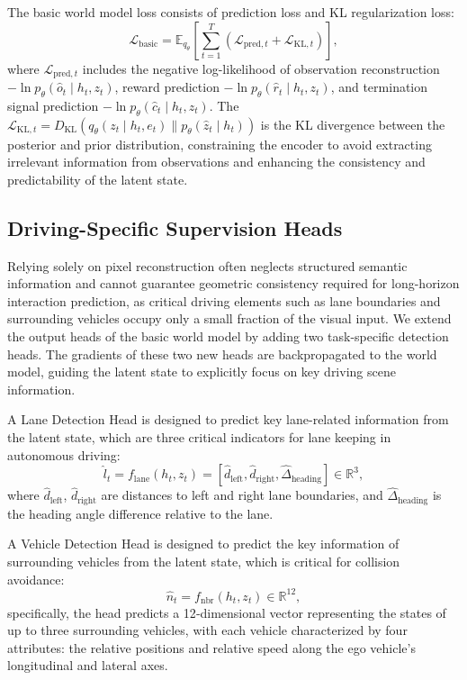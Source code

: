 The basic world model loss consists of prediction loss and KL regularization loss:
\begin{equation}
\mathcal{L}_{\text{basic}} = \mathbb{E}_{q_\theta}\left[\sum_{t=1}^{T} \left(\mathcal{L}_{\text{pred},t} + \mathcal{L}_{\text{KL},t}\right)\right],
\end{equation}
where $\mathcal{L}_{\text{pred},t}$ includes the negative log-likelihood of observation reconstruction $-\ln p_\theta(\hat{o}_t \mid h_t, z_t)$, reward prediction $-\ln p_\theta(\hat{r}_t \mid h_t, z_t)$, and termination signal prediction $-\ln p_\theta(\hat{c}_t \mid h_t, z_t)$. The $\mathcal{L}_{\text{KL}, t} = D_{\text{KL}}(q_\theta(z_t \mid h_t, e_t) \parallel p_\theta(\hat{z}_t \mid h_t))$ is the KL divergence between the posterior and prior distribution, constraining the encoder to avoid extracting irrelevant information from observations and enhancing the consistency and predictability of the latent state.

\subsection{Driving-Specific Supervision Heads}
Relying solely on pixel reconstruction often neglects structured semantic information and cannot guarantee geometric consistency required for long-horizon interaction prediction, as critical driving elements such as lane boundaries and surrounding vehicles occupy only a small fraction of the visual input. We extend the output heads of the basic world model by adding two task-specific detection heads. The gradients of these two new heads are backpropagated to the world model, guiding the latent state to explicitly focus on key driving scene information.

A Lane Detection Head is designed to predict key lane-related information from the latent state, which are three critical indicators for lane keeping in autonomous driving: 
\begin{equation}
\hat{l}_t = f_{\text{lane}}(h_t,z_t) = \left[\hat{d}_{\text{left}}, \hat{d}_{\text{right}}, \hat{\Delta}_{\text{heading}}\right] \in \mathbb{R}^{3},
\end{equation}
where $\hat{d}_{\text{left}}$, $\hat{d}_{\text{right}}$ are distances to left and right lane boundaries, and $\hat{\Delta}_{\text{heading}}$ is the heading angle difference relative to the lane.

A Vehicle Detection Head is designed to predict the key information of surrounding vehicles from the latent state, which is critical for collision avoidance:
\begin{equation}
\hat{n}_t = f_{\text{nbr}}(h_t,z_t) \in \mathbb{R}^{12},
\end{equation}
specifically, the head predicts a 12‑dimensional vector representing the states of up to three surrounding vehicles, with each vehicle characterized by four attributes: the relative positions and relative speed along the ego vehicle's longitudinal and lateral axes.

